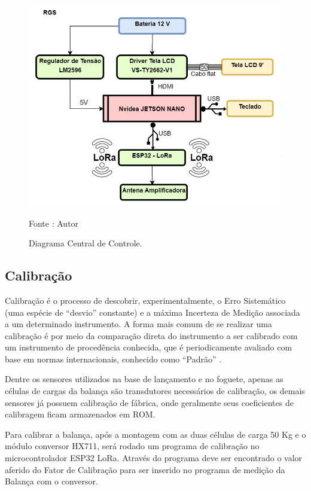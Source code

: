 \begin{figure}[H]
  \centering
  \includegraphics[scale=0.6]{figuras/Maleta_Diagrama.jpg}
  \caption{Diagrama Central de Controle. } 
  {\footnotesize Fonte : Autor } 
  \label{fig:CentraldeCOntrole}
\end{figure}

\subsection{Calibração}
Calibração é o processo de descobrir, experimentalmente, o Erro Sistemático (uma espécie de “desvio” constante) e a máxima Incerteza de Medição associada a um determinado instrumento. A forma mais comum de se realizar uma calibração é por meio da comparação direta do instrumento a ser calibrado com um instrumento de procedência conhecida, que é periodicamente avaliado com base em normas internacionais, conhecido como “Padrão” \cite{CALIBRACAO}.

Dentre os sensores utilizados na base de lançamento e no foguete, apenas as células de cargas da balança são transdutores necessários de calibração, os demais sensores já possuem calibração de fábrica, onde geralmente seus coeficientes de calibragem ficam armazenados em ROM.

Para calibrar a balança, após a montagem com as duas células de carga 50 Kg e o módulo conversor HX711, será rodado um programa de calibração no microcontrolador ESP32 LoRa. Através do programa deve ser encontrado o valor aferido do Fator de Calibração para  ser inserido no programa de medição da Balança com o conversor.


